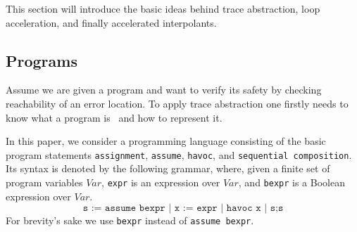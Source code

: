 \documentclass{article}
\newcommand{\Var}{\ensuremath{\mathit{Var}}\xspace}
\newcommand\mycom[1]{}
\newcommand\mycom[1]{#1}
\newcommand{\dd}[1]{\mycom{\todo[color=orange!40,inline]{\small DD: #1}}}
\begin{document}
This section will introduce the basic ideas behind trace abstraction, loop acceleration, and finally accelerated interpolants.

\subsection{Programs}

Assume we are given a program and want to verify its safety by checking reachability of an error location.
To apply trace abstraction one firstly needs to know what a program is~\cite{DBLP:journals/corr/GreitschusDP17} and how to represent it.

In this paper, we consider a programming language consisting of the basic program statements \texttt{assignment}, \texttt{assume}, \texttt{havoc}, and \texttt{sequential composition}.
Its syntax is denoted by the following grammar, where, given a finite set of program variables \Var, \texttt{expr} is an expression over \Var, and \texttt{bexpr} is a Boolean expression over \Var.
\begin{equation*}
	\texttt{s := assume bexpr | x := expr | havoc x | s;s}
\end{equation*}
For brevity's sake we use \texttt{bexpr} instead of \texttt{assume bexpr}.
\end{document}
